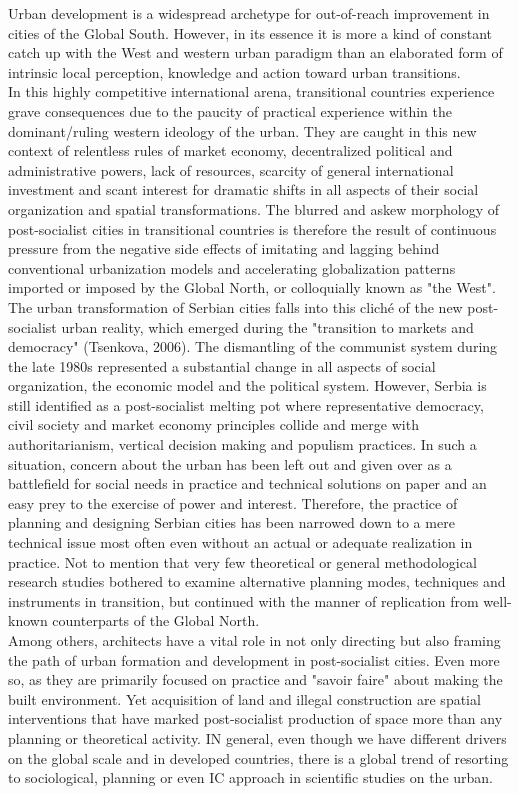 \documentclass[11pt]{report}
\begin{document}
Urban development is a widespread archetype for out-of-reach improvement in cities of the Global South. However, in its essence it is more a kind of constant catch up with the West and western urban paradigm than an elaborated form of intrinsic local perception, knowledge and action toward urban transitions. 
\\
In this highly competitive international arena, transitional countries experience grave consequences due to the paucity of practical experience within the dominant/ruling western ideology of the urban. They are caught in this new context of relentless rules of market economy, decentralized political and administrative powers, lack of resources, scarcity of general international investment and scant interest for dramatic shifts in all aspects of their social organization and spatial transformations. The blurred and askew morphology of post-socialist cities in transitional countries is therefore the result of continuous pressure from the negative side effects of imitating and lagging behind conventional urbanization models and accelerating globalization patterns imported or imposed by the Global North, or colloquially known as "the West".
\\
The urban transformation of Serbian cities falls into this cliché of the new post-socialist urban reality, which emerged during the "transition to markets and democracy" (Tsenkova, 2006). The dismantling of the communist system during the late 1980s represented a substantial change in all aspects of social organization, the economic model and the political system. However, Serbia is still identified as a post-socialist melting pot where representative democracy, civil society and market economy principles collide and merge with authoritarianism, vertical decision making and populism practices. In such a situation, concern about the urban has been left out and given over as a battlefield for social needs in practice and technical solutions on paper and an easy prey to the exercise of power and interest. Therefore, the practice of planning and designing Serbian cities has been narrowed down to a mere technical issue most often even without an actual or adequate realization in practice. Not to mention that very few theoretical or general methodological research studies bothered to examine alternative planning modes, techniques and instruments in transition, but continued with the manner of replication from well-known counterparts of the Global North.
\\
Among others, architects have a vital role in not only directing but also framing the path of urban formation and development in post-socialist cities. Even more so, as they are primarily focused on practice and "savoir faire" about making the built environment. Yet acquisition of land and illegal construction are spatial interventions that have marked post-socialist production of space more than any planning or theoretical activity. IN general, even though we have different drivers on the global scale and in developed countries, there is a global trend of resorting to sociological, planning or even IC approach in scientific studies on the urban. 
\end{document}
